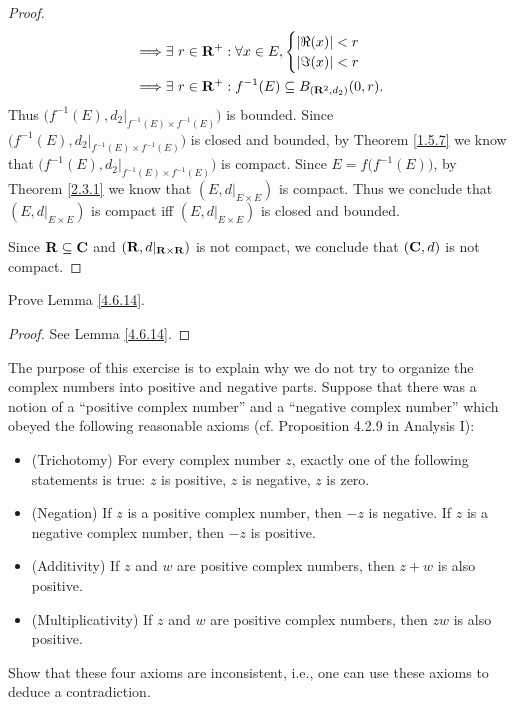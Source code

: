 \begin{proof}
\begin{align*}
        \implies & \exists\ r \in \mathbf{R}^+ : \forall x \in E, \begin{cases}
                                                              \left\lvert\Re(x)\right\rvert < r \\
                                                              \left\lvert\Im(x)\right\rvert < r
                                                          \end{cases}                                                                         \\
        \implies & \exists\ r \in \mathbf{R}^+ : f^{-1}(E) \subseteq B_{(\mathbf{R}^2, d_2)}(0, r).
    \end{align*}
    Thus \(\big(f^{-1}(E), d_2|_{f^{-1}(E) \times f^{-1}(E)}\big)\) is bounded.
    Since \(\big(f^{-1}(E), d_2|_{f^{-1}(E) \times f^{-1}(E)}\big)\) is closed and bounded, by Theorem \ref{1.5.7} we know that \(\big(f^{-1}(E), d_2|_{f^{-1}(E) \times f^{-1}(E)}\big)\) is compact.
    Since \(E = f\big(f^{-1}(E)\big)\), by Theorem \ref{2.3.1} we know that \((E, d|_{E \times E})\) is compact.
    Thus we conclude that \((E, d|_{E \times E})\) is compact iff \((E, d|_{E \times E})\) is closed and bounded.

    Since \(\mathbf{R} \subseteq \mathbf{C}\) and \((\mathbf{R}, d|_{\mathbf{R} \times \mathbf{R}})\) is not compact, we conclude that \((\mathbf{C}, d)\) is not compact.
\end{proof}

\begin{exercise}\label{ex 4.6.14}
    Prove Lemma \ref{4.6.14}.
\end{exercise}

\begin{proof}
    See Lemma \ref{4.6.14}.
\end{proof}

\begin{exercise}\label{ex 4.6.15}
    The purpose of this exercise is to explain why we do not try to organize the complex numbers into positive and negative parts.
    Suppose that there was a notion of a ``positive complex number'' and a ``negative complex number'' which obeyed the following reasonable axioms (cf. Proposition 4.2.9 in Analysis I):
    \begin{itemize}
        \item (Trichotomy)
              For every complex number \(z\), exactly one of the following statements is true:
              \(z\) is positive, \(z\) is negative, \(z\) is zero.
        \item (Negation)
              If \(z\) is a positive complex number, then \(-z\) is negative.
              If \(z\) is a negative complex number, then \(-z\) is positive.
        \item (Additivity)
              If \(z\) and \(w\) are positive complex numbers, then \(z + w\) is also positive.
        \item (Multiplicativity)
              If \(z\) and \(w\) are positive complex numbers, then \(zw\) is also positive.
    \end{itemize}
    Show that these four axioms are inconsistent, i.e., one can use these axioms to deduce a contradiction.
\end{exercise}

